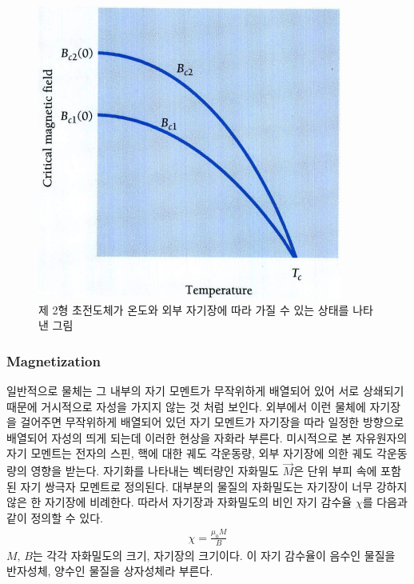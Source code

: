 \documentclass[aps,reprint,superscriptaddress,10pt]{revtex4-2}
\begin{document}
\begin{figure}[htbp]
  \centering
  \includegraphics[scale = 0.5]{2.png}
  \caption{제 2형 초전도체가 온도와 외부 자기장에 따라 가질 수 있는 상태를 나타낸 그림}
  \label{fig:2}
\end{figure}


\subsubsection{Magnetization}
일반적으로 물체는 그 내부의 자기 모멘트가 무작위하게 배열되어 있어 서로 상쇄되기 
때문에 거시적으로 자성을 가지지 않는 것 처럼 보인다. 외부에서 이런 물체에 자기장을
걸어주면 무작위하게 배열되어 있던 자기 모멘트가 자기장을 따라 일정한 방향으로 배열되어
자성의 띄게 되는데 이러한 현상을 자화라 부른다. 미시적으로 본 자유원자의 자기 모멘트는
전자의 스핀, 핵에 대한 궤도 각운동량, 외부 자기장에 의한 궤도 각운동량의 영향을 받는다.
자기화를 나타내는 벡터량인 자화밀도 $\vec{M}$은 단위 부피 속에 포함된 자기 쌍극자
모멘트로 정의된다. 대부분의 물질의 자화밀도는 자기장이 너무 강하지 않은 한 자기장에 비례한다.
따라서 자기장과 자화밀도의 비인 자기 감수율 $\chi$를 다음과 같이 정의할 수 있다.
\begin{align}
  \chi = \frac{\mu_0M}{B}
\end{align}
$M,\,B$는 각각 자화밀도의 크기, 자기장의 크기이다. 이 자기 감수율이 음수인 물질을
반자성체, 양수인 물질을 상자성체라 부른다.
\end{document}
